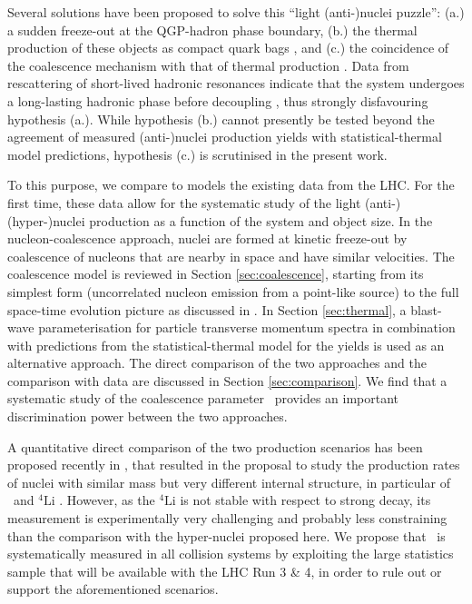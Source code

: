 Several solutions have been proposed to solve this ``light (anti-)nuclei puzzle'': (a.) a sudden freeze-out at the QGP-hadron phase boundary, (b.) the thermal production of these objects as compact quark bags \cite{Andronic:2017}, and (c.) the coincidence of the coalescence mechanism with that of thermal production \cite{Scheibl:1998tk, HeinzTorino}. 
Data from rescattering of short-lived hadronic resonances indicate that the system undergoes a long-lasting hadronic phase before decoupling \cite{Abelev:2014uua}, thus strongly disfavouring hypothesis (a.). 
While hypothesis (b.) cannot presently be tested beyond the agreement of measured (anti-)nuclei production yields with statistical-thermal model predictions, hypothesis (c.) is scrutinised in the present work.

To this purpose, we compare to models the existing data from the LHC. For the first time, these data allow for the systematic study of the light (anti-)(hyper-)nuclei production as a function of the system and object size. 
In the nucleon-coalescence approach, nuclei are formed at kinetic freeze-out by coalescence of nucleons that are nearby in space and have similar velocities. The coalescence model is reviewed in Section \ref{sec:coalescence}, starting from its simplest form (uncorrelated nucleon emission from a point-like source) to the full space-time evolution picture as discussed in \cite{Scheibl:1998tk}. In Section \ref{sec:thermal}, a blast-wave parameterisation for particle transverse momentum spectra in combination with predictions from the statistical-thermal model for the yields is used as an alternative approach. 
The direct comparison of the two approaches and the comparison with data are discussed in Section \ref{sec:comparison}.
We find that a systematic study of the coalescence parameter \bA~provides an important discrimination power between the two approaches. 

A quantitative direct comparison of the two production scenarios has been proposed recently in \cite{Mrowczynski:2016xqm}, that resulted in the proposal to study the production rates of nuclei with similar mass but very different internal structure, in particular of \hefour~and ${}^{4}\mathrm{Li}$ \cite{Bazak:2018hgl}. However, as the ${}^{4}\mathrm{Li}$ is not stable with respect to strong decay, its measurement is experimentally very challenging and probably less constraining than the comparison with the hyper-nuclei proposed here.
We propose that \bA~is systematically measured in all collision systems by exploiting the large statistics sample that will be available with the LHC Run 3 \& 4, in order to rule out or support the aforementioned scenarios. 

